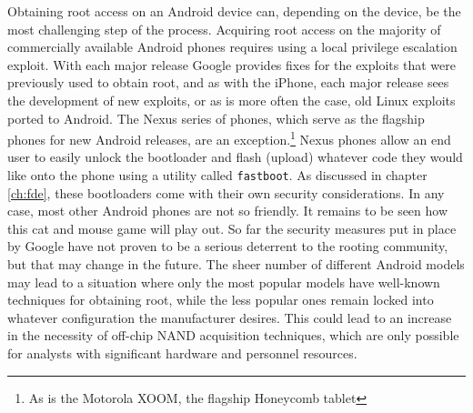Obtaining root access on an Android device can, depending on the device, be the most challenging step of the process.  Acquiring
root access on the majority of commercially available Android phones requires using a local privilege escalation exploit.  With each
major release Google provides fixes for the exploits that were previously used to obtain root, and as with the iPhone, each major
release sees the development of new exploits, or as is more often the case, old Linux exploits ported to Android.  The Nexus series
of phones, which serve as the flagship phones for new Android releases, are an exception.\footnote{As is the Motorola XOOM, the
flagship Honeycomb tablet} Nexus phones allow an end user to easily unlock the bootloader and flash (upload) whatever code they
would like onto the phone using a utility called \texttt{fastboot}.  As discussed in chapter \ref{ch:fde}, these bootloaders come
with their own security considerations.  In any case, most other Android phones are not so friendly.  It remains to be seen how this
cat and mouse game will play out.  So far the security measures put in place by Google have not proven to be a serious deterrent to
the rooting community, but that may change in the future.  The sheer number of different Android models may lead to a situation
where only the most popular models have well-known techniques for obtaining root, while the less popular ones remain locked into
whatever configuration the manufacturer desires.  This could lead to an increase in the necessity of off-chip NAND acquisition
techniques, which are only possible for analysts with significant hardware and personnel resources.

